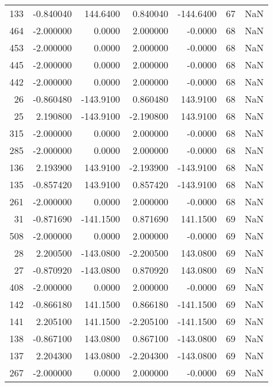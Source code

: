 \begin{tabular}{rrrrrrr}
133 &   -0.840040 &  144.6400 &    0.840040 &   -144.6400 &          67 & NaN \\
464 &   -2.000000 &    0.0000 &    2.000000 &     -0.0000 &          68 & NaN \\
453 &   -2.000000 &    0.0000 &    2.000000 &     -0.0000 &          68 & NaN \\
445 &   -2.000000 &    0.0000 &    2.000000 &     -0.0000 &          68 & NaN \\
442 &   -2.000000 &    0.0000 &    2.000000 &     -0.0000 &          68 & NaN \\
 26 &   -0.860480 & -143.9100 &    0.860480 &    143.9100 &          68 & NaN \\
 25 &    2.190800 & -143.9100 &   -2.190800 &    143.9100 &          68 & NaN \\
315 &   -2.000000 &    0.0000 &    2.000000 &     -0.0000 &          68 & NaN \\
285 &   -2.000000 &    0.0000 &    2.000000 &     -0.0000 &          68 & NaN \\
136 &    2.193900 &  143.9100 &   -2.193900 &   -143.9100 &          68 & NaN \\
135 &   -0.857420 &  143.9100 &    0.857420 &   -143.9100 &          68 & NaN \\
261 &   -2.000000 &    0.0000 &    2.000000 &     -0.0000 &          68 & NaN \\
 31 &   -0.871690 & -141.1500 &    0.871690 &    141.1500 &          69 & NaN \\
508 &   -2.000000 &    0.0000 &    2.000000 &     -0.0000 &          69 & NaN \\
 28 &    2.200500 & -143.0800 &   -2.200500 &    143.0800 &          69 & NaN \\
 27 &   -0.870920 & -143.0800 &    0.870920 &    143.0800 &          69 & NaN \\
408 &   -2.000000 &    0.0000 &    2.000000 &     -0.0000 &          69 & NaN \\
142 &   -0.866180 &  141.1500 &    0.866180 &   -141.1500 &          69 & NaN \\
141 &    2.205100 &  141.1500 &   -2.205100 &   -141.1500 &          69 & NaN \\
138 &   -0.867100 &  143.0800 &    0.867100 &   -143.0800 &          69 & NaN \\
137 &    2.204300 &  143.0800 &   -2.204300 &   -143.0800 &          69 & NaN \\
267 &   -2.000000 &    0.0000 &    2.000000 &     -0.0000 &          69 & NaN \\

\end{tabular}
